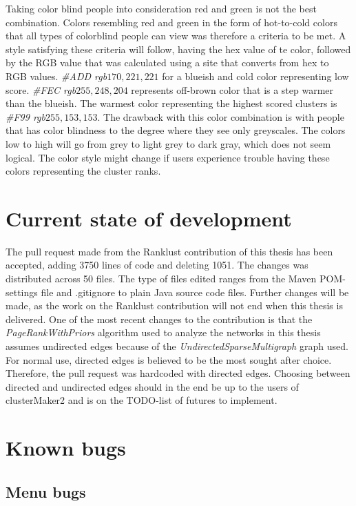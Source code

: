 Taking color blind people into consideration red and green is not the
best combination. Colors resembling red and green in the form of hot-to-cold
colors that all types of colorblind people can view was therefore a criteria to
be met. A style satisfying these criteria will follow, having the hex value of
te color\cite{color-blindness3}, followed by the RGB value that was calculated
using a site that converts from hex to RGB values\cite{color-blindness2}.
\textit{\#ADD rgb\(170,221,221\)} for a blueish and cold color representing low
score. \textit{\#FEC rgb\(255,248,204\)} represents off-brown color that is a
step warmer than the blueish. The warmest color representing the highest scored
clusters is \textit{\#F99 rgb\(255,153,153\)}. The drawback with this color
combination is with people that has color blindness to the degree where they see
only greyscales. The colors low to high will go from grey to light grey to dark
gray, which does not seem logical. The color style might change if users
experience trouble having these colors representing the cluster ranks. 

\section{Current state of development}
The pull request\cite{git-pull-request} made from the Ranklust
contribution of this thesis has been accepted\cite{ranklust-accepted}, adding
3750 lines of code and deleting 1051. The changes was distributed across 50
files. The type of files edited ranges from the Maven POM-settings file and
.gitignore to plain Java source code files. Further changes will be made, as the
work on the Ranklust contribution will not end when this thesis is delivered.
One of the most recent changes to the contribution is that the
\textit{PageRankWithPriors} algorithm used to analyze the networks in this
thesis assumes undirected edges because of the
\textit{UndirectedSparseMultigraph} graph used. For normal use, directed edges
is believed to be the most sought after choice. Therefore, the pull request was
hardcoded with directed edges. Choosing between directed and undirected edges
should in the end be up to the users of clusterMaker2 and is on the TODO-list of
futures to implement.

\section{Known bugs}
\subsection{Menu bugs}
